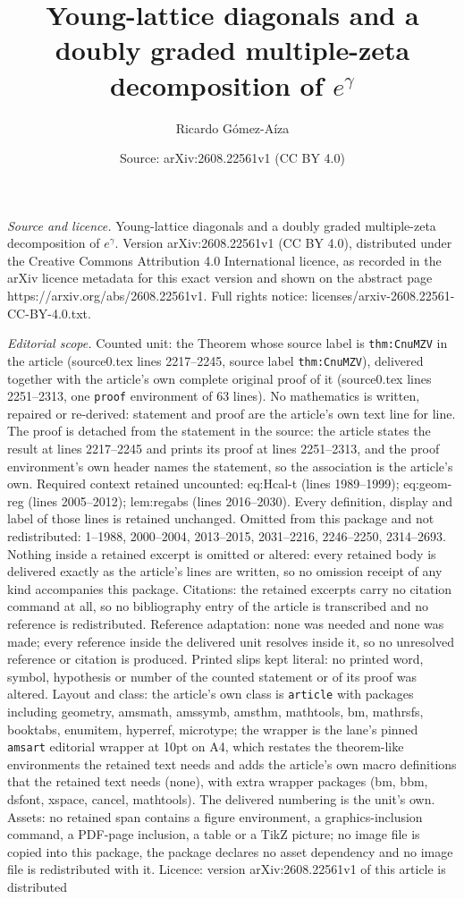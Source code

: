 \documentclass[10pt,a4paper]{amsart}
\title[Young-lattice diagonals and a doubly graded multiple-zeta de]{Young-lattice diagonals and a doubly graded multiple-zeta decomposition of $e^\gamma$}
\author{Ricardo G\'omez-A\'iza}
\date{Source: arXiv:2608.22561v1 (CC BY 4.0)}
\begin{document}
\maketitle

\noindent\emph{Source and licence.} Young-lattice diagonals and a doubly graded multiple-zeta decomposition of $e^\gamma$. Version arXiv:2608.22561v1 (CC BY 4.0), distributed under the Creative Commons Attribution 4.0 International licence, as recorded in the arXiv licence metadata for this exact version and shown on the abstract page https://arxiv.org/abs/2608.22561v1. Full rights notice: licenses/arxiv-2608.22561-CC-BY-4.0.txt.\par\smallskip

\noindent\textit{Editorial scope.} Counted unit: the Theorem whose source label is \texttt{thm:CnuMZV} in the article (source0.tex lines 2217--2245, source label \texttt{thm:CnuMZV}), delivered together with the article's own complete original proof of it (source0.tex lines 2251--2313, one \texttt{proof} environment of 63 lines). No mathematics is written, repaired or re-derived: statement and proof are the article's own text line for line. The proof is detached from the statement in the source: the article states the result at lines 2217--2245 and prints its proof at lines 2251--2313, and the proof environment's own header names the statement, so the association is the article's own. Required context retained uncounted: eq:Hcal-t (lines 1989--1999); eq:geom-reg (lines 2005--2012); lem:regabs (lines 2016--2030). Every definition, display and label of those lines is retained unchanged. Omitted from this package and not redistributed: 1--1988, 2000--2004, 2013--2015, 2031--2216, 2246--2250, 2314--2693. Nothing inside a retained excerpt is omitted or altered: every retained body is delivered exactly as the article's lines are written, so no omission receipt of any kind accompanies this package. Citations: the retained excerpts carry no citation command at all, so no bibliography entry of the article is transcribed and no reference is redistributed. Reference adaptation: none was needed and none was made; every reference inside the delivered unit resolves inside it, so no unresolved reference or citation is produced. Printed slips kept literal: no printed word, symbol, hypothesis or number of the counted statement or of its proof was altered. Layout and class: the article's own class is \texttt{article} with packages including geometry, amsmath, amssymb, amsthm, mathtools, bm, mathrsfs, booktabs, enumitem, hyperref, microtype; the wrapper is the lane's pinned \texttt{amsart} editorial wrapper at 10pt on A4, which restates the theorem-like environments the retained text needs and adds the article's own macro definitions that the retained text needs (none), with extra wrapper packages (bm, bbm, dsfont, xspace, cancel, mathtools). The delivered numbering is the unit's own. Assets: no retained span contains a figure environment, a graphics-inclusion command, a PDF-page inclusion, a table or a TikZ picture; no image file is copied into this package, the package declares no asset dependency and no image file is redistributed with it. Licence: version arXiv:2608.22561v1 of this article is distributed 
\end{document}
